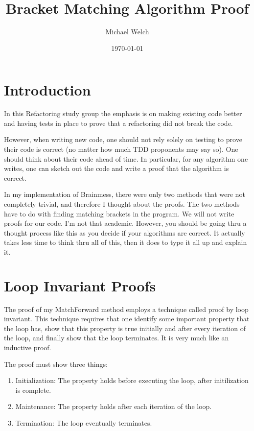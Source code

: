 \documentclass[10pt]{amsart}
\begin{document}
\title{Bracket Matching Algorithm Proof}
\author{Michael Welch}
\date{\today}
\maketitle

\section*{Introduction}
In this Refactoring study group the emphasis is on making existing code
better and having tests in place to prove that a refactoring did not
break the code.

However, when writing new code, one should not rely solely on testing
to prove their code is correct (no matter how much TDD proponents may say
so). One should think about their code ahead of time. In particular,
for any algorithm one writes, one can sketch out
the code and write a proof that the algorithm is correct.

In my implementation of Brainmess, there were only two methods that
were not completely trivial, and therefore I thought about the proofs.
The two methods have to do with finding matching brackets in the program.
We will not write proofs for our code. I'm not that academic.
However, you should be going thru a thought process like this as you decide
if your algorithms are correct. It actually takes less time to think 
thru all of this, then it does to type it all up and explain it.

\section*{Loop Invariant Proofs}
The proof of my MatchForward method employs a technique called
proof by loop invariant. This technique requires that one
identify some important property that the loop has, show that this
property is true initially and after every iteration of the loop,
and finally show that the loop terminates. It is very
much like an inductive proof.

The proof must show three things:

\begin{enumerate}
\item Initialization: The property holds before executing the loop, after initilization is complete.

\item Maintenance: The property holds after each iteration of the loop.

\item Termination: The loop eventually terminates.
\end{enumerate}
\end{document}
